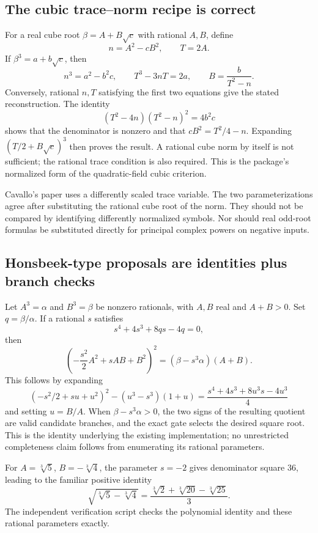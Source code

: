 \documentclass[11pt,a4paper]{article}
\theoremstyle{remark}\newtheorem{remark}[theorem]{Remark}
\begin{document}
\subsection{The cubic trace--norm recipe is correct}
For a real cube root $\beta=A+B\sqrt c$ with rational $A,B$, define
\[
 n=A^2-cB^2,\qquad T=2A.
\]
If $\beta^3=a+b\sqrt c$, then
\begin{equation}\label{eq:cubicconditions}
 n^3=a^2-b^2c,\qquad T^3-3nT=2a,
 \qquad B=\frac{b}{T^2-n}.
\end{equation}
Conversely, rational $n,T$ satisfying the first two equations give the stated reconstruction. The identity
\[
 (T^2-4n)(T^2-n)^2=4b^2c
\]
shows that the denominator is nonzero and that $cB^2=T^2/4-n$. Expanding $(T/2+B\sqrt c)^3$ then proves the result. A rational cube norm by itself is not sufficient; the rational trace condition is also required. This is the package's normalized form of the quadratic-field cubic criterion.\cite{reviewB,cavallo}

Cavallo's paper uses a differently scaled trace variable. The two parameterizations agree after substituting the rational cube root of the norm. They should not be compared by identifying differently normalized symbols. Nor should real odd-root formulas be substituted directly for principal complex powers on negative inputs.

\subsection{Honsbeek-type proposals are identities plus branch checks}
Let $A^3=\alpha$ and $B^3=\beta$ be nonzero rationals, with $A,B$ real and $A+B>0$. Set $q=\beta/\alpha$. If a rational $s$ satisfies
\[
 s^4+4s^3+8qs-4q=0,
\]
then
\[
 \left(-\frac{s^2}{2}A^2+sAB+B^2\right)^2
   =(\beta-s^3\alpha)(A+B).
\]
This follows by expanding
\[
 \left(-s^2/2+su+u^2\right)^2-(u^3-s^3)(1+u)
 =\frac{s^4+4s^3+8u^3s-4u^3}{4}
\]
and setting $u=B/A$. When $\beta-s^3\alpha>0$, the two signs of the resulting quotient are valid candidate branches, and the exact gate selects the desired square root. This is the identity underlying the existing implementation; no unrestricted completeness claim follows from enumerating its rational parameters.\cite{report,reviewB,honsbeek}

For $A=\sqrt[3]5$, $B=-\sqrt[3]4$, the parameter $s=-2$ gives denominator square $36$, leading to the familiar positive identity
\[
 \sqrt{\sqrt[3]5-\sqrt[3]4}
 =\frac{\sqrt[3]2+\sqrt[3]{20}-\sqrt[3]{25}}3.
\]
The independent verification script checks the polynomial identity and these rational parameters exactly.
\end{document}
